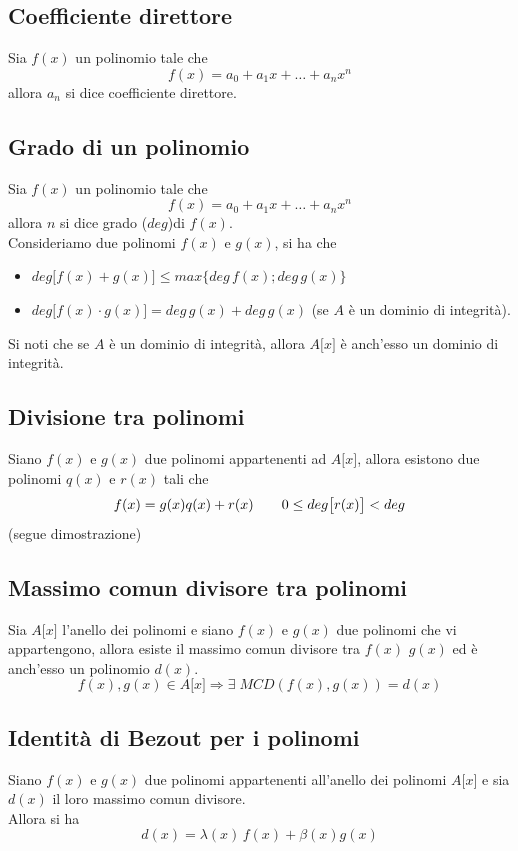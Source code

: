 \begin{flushleft}
\subsection{Coefficiente direttore}
Sia $f(x)$ un polinomio tale che
\[f(x) = a_0 + a_1 x +\hdots+a_n x^n\]
allora $a_n$ si dice coefficiente direttore.


\subsection{Grado di un
polinomio}
Sia $f(x)$ un polinomio tale che
\[f(x) = a_0 + a_1 x +\hdots+a_n x^n\]
allora $n$ si dice grado ($deg$)di $f(x)$.\\
Consideriamo due polinomi $f(x)$ e $g(x)$, si ha che
\begin{itemize}
    \item $deg\big[f(x) + g(x)\big]\leq max\{deg\,f(x);deg\,g(x)\}$
    \item $deg\big[f(x) \cdot g(x)\big] = deg\,g(x)+ deg\,g(x)$ (se $A$ è un dominio di integrità).
\end{itemize}
Si noti che se $A$ è un dominio di integrità, allora $A\big[x\big]$ è anch'esso un dominio di integrità.

\subsection{Divisione tra polinomi}
Siano $f(x)$ e $g(x)$ due polinomi appartenenti ad $A\big[x\big]$, allora esistono due polinomi $q(x)$ e $r(x)$ tali che
\[f(x) = g(x)q(x) + r(x)\hspace{20px}0\leq deg \big[r(x)\big] < deg\]
(segue dimostrazione)
\\ \vspace{300px}


\subsection{Massimo comun divisore tra polinomi}
Sia $A\big[x\big]$ l'anello dei polinomi e siano $f(x)$ e $g(x)$ due polinomi che vi appartengono, allora esiste il massimo comun divisore tra $f(x)$  $g(x)$ ed è anch'esso un polinomio $d(x)$.
\[f(x),g(x)\in A\big[x\big] \Rightarrow \exists\;MCD(f(x), g(x))= d(x)\]

\subsection{Identità di Bezout per i polinomi}
Siano $f(x)$ e $g(x)$ due polinomi appartenenti all'anello dei polinomi $A\big[x\big]$ e sia $d(x)$ il loro massimo comun divisore.\\
Allora si ha
\[
d(x) = \lambda(x)\,f(x) + \beta(x)g(x)
\]


\end{flushleft}

